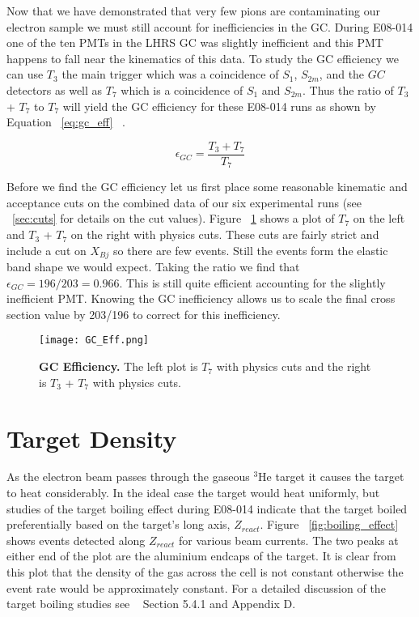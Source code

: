 Now that we have demonstrated that very few pions are contaminating our electron sample we must still account for inefficiencies in the GC. During E08-014 one of the ten PMTs in the LHRS GC was slightly inefficient and this PMT happens to fall near the kinematics of this data. To study the GC efficiency we can use $T_3$ the main trigger which was a coincidence of $S_1$, $S_{2m}$, and the $GC$ detectors as well as $T_7$ which is a coincidence of $S_1$ and $S_{2m}$. Thus the ratio of $T_3$ + $T_7$ to $T_7$ will yield the GC efficiency for these E08-014 runs as shown by Equation ~\ref{eq:gc_eff} ~\cite{dien_gc}. 

\begin{equation} \label{eq:gc_eff}
	\epsilon_{GC} = \frac{T_3+T_7}{T_7}
\end{equation}

Before we find the GC efficiency let us first place some reasonable kinematic and acceptance cuts on the combined data of our six experimental runs (see ~\ref{sec:cuts} for details on the cut values). Figure ~\ref{fig:gc_eff} shows a plot of $T_7$ on the left and $T_3$ + $T_7$ on the right with physics cuts. These cuts are fairly strict and include a cut on $X_{Bj}$ so there are few events. Still the events form the elastic band shape we would expect. Taking the ratio we find that $\epsilon_{GC} = 196/203 = 0.966$. This is still quite efficient accounting for the slightly inefficient PMT. Knowing the GC inefficiency allows us to scale the final cross section value by 203/196 to correct for this inefficiency.

\begin{figure}[!ht]
\begin{center}
\texttt{[image: GC\_Eff.png]}
\end{center}
\caption{
{\bf{GC Efficiency.}} The left plot is $T_7$ with physics cuts and the right is $T_3$ + $T_7$ with physics cuts.}
\label{fig:gc_eff}
\end{figure}

\section{Target Density}
\label{sec:density}

As the electron beam passes through the gaseous $^3$He target it causes the target to heat considerably. In the ideal case the target would heat uniformly, but studies of the target boiling effect during E08-014 indicate that the target boiled preferentially based on the target's long axis, $Z_{react}$. Figure ~\ref{fig:boiling_effect} shows events detected along $Z_{react}$ for various beam currents. The two peaks at either end of the plot are the aluminium endcaps of the target. It is clear from this plot that the density of the gas across the cell is not constant otherwise the event rate would be approximately constant. For a detailed discussion of the target boiling studies see ~\cite{Thesis:Ye} Section 5.4.1 and Appendix D. 

